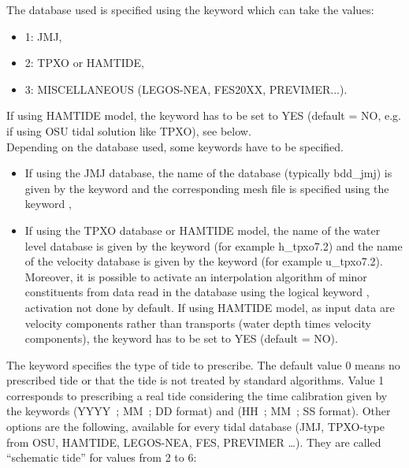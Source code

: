 The database used is specified using the keyword  which
can take the values:

\begin{itemize}
\item 1: JMJ,

\item 2: TPXO or HAMTIDE,

\item 3: MISCELLANEOUS (LEGOS-NEA, FES20XX, PREVIMER...).
\end{itemize}

If using HAMTIDE model, the keyword
 has to be set to YES
(default = NO, e.g. if using OSU tidal solution like TPXO), see below.
\\

Depending on the database used, some keywords have to be specified.

\begin{itemize}
\item If using the JMJ database, the name of the database (typically bdd\_jmj)
is given by the keyword  and the corresponding
mesh file is specified using the keyword ,

\item If using the TPXO database or HAMTIDE model, the name of the water level
database is given
by the keyword  (for example h\_tpxo7.2) and
the name of the velocity database is given by the keyword  (for example u\_tpxo7.2). Moreover, it is possible to
activate an interpolation algorithm of minor constituents from data read in the
database using the logical keyword ,
activation not done by default.
If using HAMTIDE model, as input data are velocity components rather than
transports (water depth times velocity components), the keyword
 has to be set to YES
(default = NO).
\end{itemize}

The keyword  specifies the type of tide to prescribe. The default value
0 means no prescribed tide or that the tide is not treated by standard
algorithms. Value 1 corresponds to prescribing a real tide considering the time
calibration given by the keywords  (YYYY~; MM~;
DD format) and  (HH~; MM~; SS format). Other
options are the following, available for every tidal database (JMJ,
TPXO-type from OSU, HAMTIDE, LEGOS-NEA, FES, PREVIMER \ldots).
They are called “schematic tide” for values from 2 to 6:

